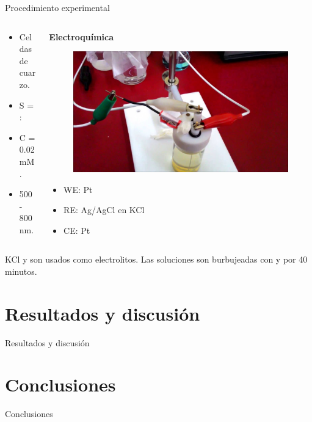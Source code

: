 \documentclass[handout]{beamer}
\begin{document}
\begin{frame}{Procedimiento experimental}
\begin{columns}
\begin{column}{0.25\linewidth}
\begin{figure}[h]
			\end{figure}
			\tiny
			\begin{itemize}
				\item Celdas de cuarzo.
				\item S =  : 
				\item C = 0.02 mM.
				\item 500 - 800 nm.
			\end{itemize}
		\end{column}
		\begin{column}{0.2\linewidth}
			\textbf{Electroqu\'imica}
			\begin{figure}[h]
				\centering
				\includegraphics[width=\textwidth]{sources/electrical}
			\end{figure}
			\tiny
			\begin{itemize}
				\item WE: Pt
				\item RE: Ag/AgCl en KCl
				\item CE: Pt
			\end{itemize}
		\end{column}
	\end{columns}
	\vspace{1cm}
	KCl y  son usados como electrolitos. Las soluciones son burbujeadas con  y  por 40 minutos.
\end{frame}


\section{Resultados y discusi\'on}
\begin{frame}{Resultados y discusi\'on}
\end{frame}

\section{Conclusiones}
\begin{frame}{Conclusiones}
\end{frame}
\end{document}
